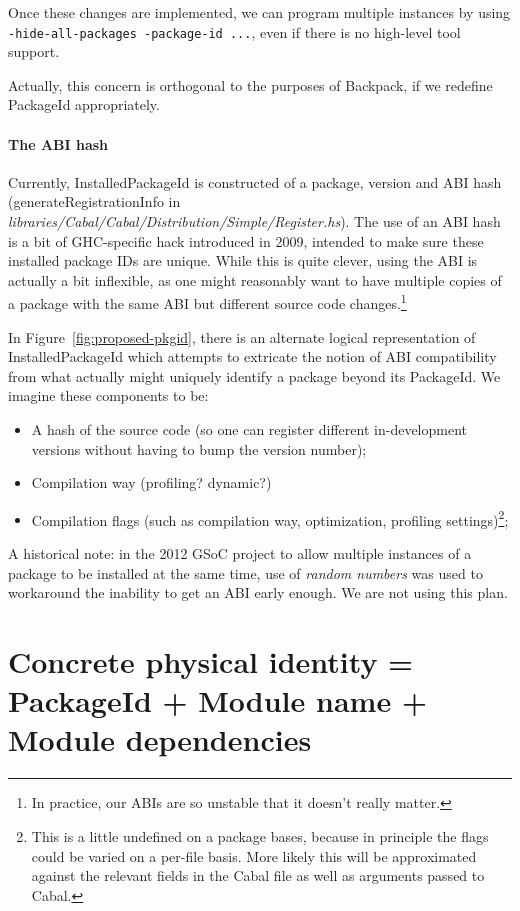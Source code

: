 \documentclass{article}
\newcommand{\ghcfile}[1]{\textsl{#1}}
\begin{document}
Once these changes are implemented, we can program multiple instances by
using \verb|-hide-all-packages -package-id ...|, even if there is no
high-level tool support.

Actually, this concern is orthogonal to the purposes of Backpack, if
we redefine PackageId appropriately.

\paragraph{The ABI hash} Currently, InstalledPackageId
is constructed of a package, version and ABI hash
(generateRegistrationInfo in
\ghcfile{libraries/Cabal/Cabal/Distribution/Simple/Register.hs}).  The
use of an ABI hash is a bit of GHC-specific hack introduced in 2009,
intended to make sure these installed package IDs are unique.  While
this is quite clever, using the ABI is actually a bit inflexible, as one
might reasonably want to have multiple copies of a package with the same
ABI but different source code changes.\footnote{In practice, our ABIs
are so unstable that it doesn't really matter.}

In Figure~\ref{fig:proposed-pkgid}, there is an alternate logical
representation of InstalledPackageId which attempts to extricate the
notion of ABI compatibility from what actually might uniquely identify a
package beyond its PackageId.  We imagine these components to be:

\begin{itemize}
    \item A hash of the source code (so one can register different
        in-development versions without having to bump the version
        number);
    \item Compilation way (profiling? dynamic?)
    \item Compilation flags (such as compilation way, optimization,
        profiling settings)\footnote{This is a little undefined on a package bases, because in principle the flags could be varied on a per-file basis. More likely this will be approximated against the relevant fields in the Cabal file as well as arguments passed to Cabal.};
\end{itemize}

A historical note: in the 2012 GSoC project to allow multiple instances
of a package to be installed at the same time, use of \emph{random
numbers} was used to workaround the inability to get an ABI early
enough.  We are not using this plan.

\section{Concrete physical identity = PackageId + Module name + Module dependencies}\label{sec:ipi}
\end{document}
